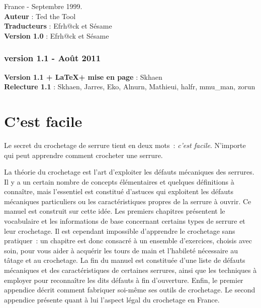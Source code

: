 \documentclass[a4paper,french,11pt,twoside]{report}
\begin{document}
\noindent France - Septembre 1999.\\
\noindent \textbf{Auteur} : Ted the Tool \\
\noindent \textbf{Traducteurs} : Efrh@ck et Sésame \\
\noindent \textbf{Version 1.0} : Efrh@ck et Sésame \\

{\centering \subsection*{version 1.1 - Août 2011}}

\medskip
\noindent \textbf{Version 1.1 + \LaTeX + mise en page} : Skhaen \\
\noindent \textbf{Relecture 1.1} : Skhaen, Jarres, Eko, Alnurn, Mathieui, halfr, mmu\_man, zorun \\

\newpage
\strut
\newpage


\tableofcontents
\newpage

\chapter{\label{chap:cest_facile}C'est facile}

Le secret du crochetage de serrure tient en deux mots~: \emph{c'est facile}. N'importe qui peut apprendre comment crocheter une serrure.

\medskip
La théorie du crochetage est l'art d'exploiter les défauts mécaniques des serrures. Il y a un certain nombre de concepts élémentaires et quelques définitions à connaître, mais l'essentiel est constitué d'astuces qui exploitent les défauts mécaniques particuliers ou les caractéristiques propres de la serrure à ouvrir. Ce manuel est construit sur cette idée. Les premiers chapitres présentent le vocabulaire et les informations de base concernant certains types de serrure et leur crochetage. Il est cependant impossible d'apprendre le crochetage sans pratiquer~: un chapitre est donc consacré à un ensemble d'exercices, choisis avec soin, pour vous aider à acquérir les tours de main et l'habileté nécessaire au tâtage et au crochetage. La fin du manuel est constituée d'une liste de défauts mécaniques et des caractéristiques de certaines serrures, ainsi que les techniques à employer pour reconnaître les dits défauts à fin d'ouverture. Enfin, le premier appendice décrit comment fabriquer soi-même ses outils de crochetage. Le second appendice présente quant à lui l'aspect légal du crochetage en France.
\end{document}
